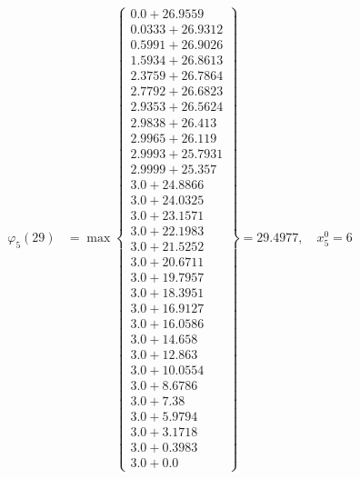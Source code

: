 \documentclass{article}
\begin{document}
\begin{align*}
\varphi_{5}(29) &= \max \left\{ \begin{array}{c}
0.0 + 26.9559 \\
 0.0333 + 26.9312 \\
 0.5991 + 26.9026 \\
 1.5934 + 26.8613 \\
 2.3759 + 26.7864 \\
 2.7792 + 26.6823 \\
 2.9353 + 26.5624 \\
 2.9838 + 26.413 \\
 2.9965 + 26.119 \\
 2.9993 + 25.7931 \\
 2.9999 + 25.357 \\
 3.0 + 24.8866 \\
 3.0 + 24.0325 \\
 3.0 + 23.1571 \\
 3.0 + 22.1983 \\
 3.0 + 21.5252 \\
 3.0 + 20.6711 \\
 3.0 + 19.7957 \\
 3.0 + 18.3951 \\
 3.0 + 16.9127 \\
 3.0 + 16.0586 \\
 3.0 + 14.658 \\
 3.0 + 12.863 \\
 3.0 + 10.0554 \\
 3.0 + 8.6786 \\
 3.0 + 7.38 \\
 3.0 + 5.9794 \\
 3.0 + 3.1718 \\
 3.0 + 0.3983 \\
 3.0 + 0.0
\end{array} \right\}=29.4977, \quad x_{5}^0=6\\
  

\end{align*}
\end{document}
